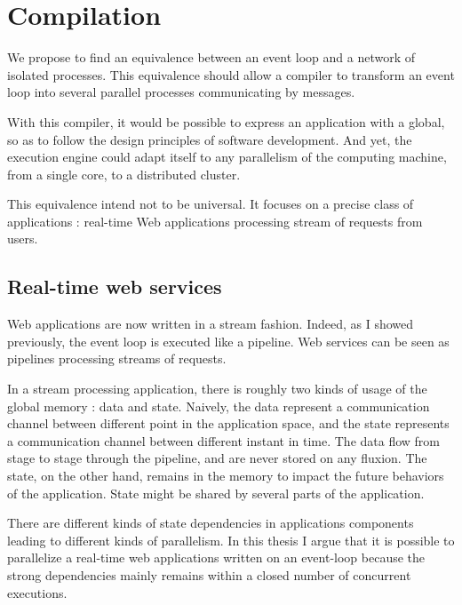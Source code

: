 \section{Compilation}

We propose to find an equivalence between an event loop and a network of isolated processes.
This equivalence should allow a compiler to transform an event loop into several parallel processes communicating by messages.

With this compiler, it would be possible to express an application with a global, so as to follow the design principles of software development.
And yet, the execution engine could adapt itself to any parallelism of the computing machine, from a single core, to a distributed cluster.

This equivalence intend not to be universal.
It focuses on a precise class of applications : real-time Web applications processing stream of requests from users.

\subsection{Real-time web services}

Web applications are now written in a stream fashion.
Indeed, as I showed previously, the event loop is executed like a pipeline.
Web services can be seen as pipelines processing streams of requests.

In a stream processing application, there is roughly two kinds of usage of the global memory : data and state.
Naively, the data represent a communication channel between different point in the application space, and the state represents a communication channel between different instant in time.
The data flow from stage to stage through the pipeline, and are never stored on any fluxion.
The state, on the other hand, remains in the memory to impact the future behaviors of the application.
State might be shared by several parts of the application.

There are different kinds of state dependencies in applications components leading to different kinds of parallelism.
In this thesis I argue that it is possible to parallelize a real-time web applications written on an event-loop because the strong dependencies mainly remains within a closed number of concurrent executions.